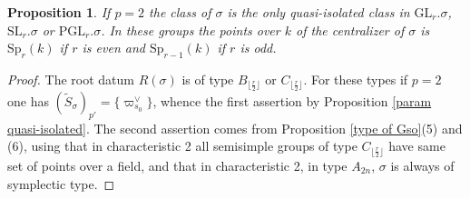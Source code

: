 \documentclass{amsart}
\newtheorem{proposition}[equation]{Proposition}
\numberwithin{equation}{section}
\theoremstyle{definition}
\theoremstyle{remark}
\newcommand\GL{\mathrm{GL}}
\newcommand\SL{\mathrm{SL}}
\newcommand\PGL{\mathrm{PGL}}
\newcommand\Sp{\mathrm{Sp}}
\begin{document}
\begin{proposition}
If  $p=2$  the class of $\sigma$ is the only
quasi-isolated class in $\GL_r.\sigma$, $\SL_r.\sigma$ or $\PGL_r.\sigma$.
In  these groups the points over $k$ of the 
centralizer of $\sigma$  is $\Sp_r(k)$ if $r$ is even and
$\Sp_{r-1}(k)$ if $r$ is odd.
\end{proposition}
\begin{proof}
The  root  datum  $R(\sigma)$  is  of  type $B_{\lfloor\frac r2\rfloor}$ or
$C_{\lfloor\frac  r2\rfloor}$. For  these types  if $p=2$  one has $(\tilde
S_\sigma)_{p'}=\{\varpi^\vee_{s_0}\}$,   whence  the   first  assertion  by
Proposition  \ref{param  quasi-isolated}.  The  second assertion comes from
Proposition  \ref{type of Gso}(5)  and (6), using  that in characteristic 2
all semisimple groups of type $C_{\lfloor\frac r2\rfloor}$ have same set of
points over a field,
and  that  in  characteristic  2,  in  type $A_{2n}$, $\sigma$ is always of
symplectic type.
\end{proof}
\end{document}
